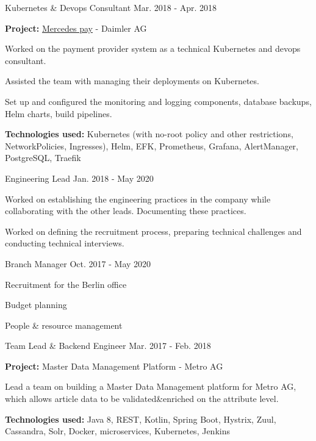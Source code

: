 \begin{cventries}
    \cventry
    {Kubernetes \& Devops Consultant}
    {}
    {}
    {Mar. 2018 - Apr. 2018}
    {
    \begin{cvitems}
        \item {
        \textbf{Project:} \href{https://www.daimler-mobility.com/en/solutions/mobility-ecosystem/portfolio/payment-services/}{Mercedes pay} - Daimler AG
        }
        \newline
        \item {Worked on the payment provider system as a technical Kubernetes and devops consultant.}
        \item {Assisted the team with managing their deployments on Kubernetes.}
        \item {
        Set up and configured the monitoring and logging components, database backups,
        Helm charts, build pipelines.
        }
        \smallskip
        \item {
        \textbf{Technologies used:} Kubernetes (with no-root policy and other restrictions,
        NetworkPolicies, Ingresses), Helm, EFK, Prometheus,
        Grafana, AlertManager, PostgreSQL, Traefik
        }
    \end{cvitems}
    }

    \cventry
    {Engineering Lead}
    {}
    {}
    {Jan. 2018 - May 2020}
    {
    \begin{cvitems}
        \item {
        Worked on establishing the engineering practices in the company while
        collaborating with the other leads. Documenting these practices.
        }
        \item {
        Worked on defining the recruitment process, preparing technical challenges
        and conducting technical interviews.
        }
    \end{cvitems}
    }

    \cventry
    {Branch Manager}
    {}
    {}
    {Oct. 2017 - May 2020}
    {
    \begin{cvitems}
        \item {Recruitment for the Berlin office}
        \item {Budget planning}
        \item {People \& resource management}
    \end{cvitems}
    }

    \cventry
    {Team Lead \& Backend Engineer}
    {}
    {}
    {Mar. 2017 - Feb. 2018}
    {
    \begin{cvitems}
        \item {
        \textbf{Project:} Master Data Management Platform - Metro AG
        }
        \newline
        \item {
        Lead a team on building a Master Data Management platform for Metro AG,
        which allows article data to be validated\&enriched on the attribute level.
        }
        \smallskip
        \item {
        \textbf{Technologies used:} Java 8, REST, Kotlin, Spring Boot, Hystrix, Zuul, Cassandra,
        Solr, Docker, microservices, Kubernetes, Jenkins
        }
    \end{cvitems}
    }


\end{cventries}
